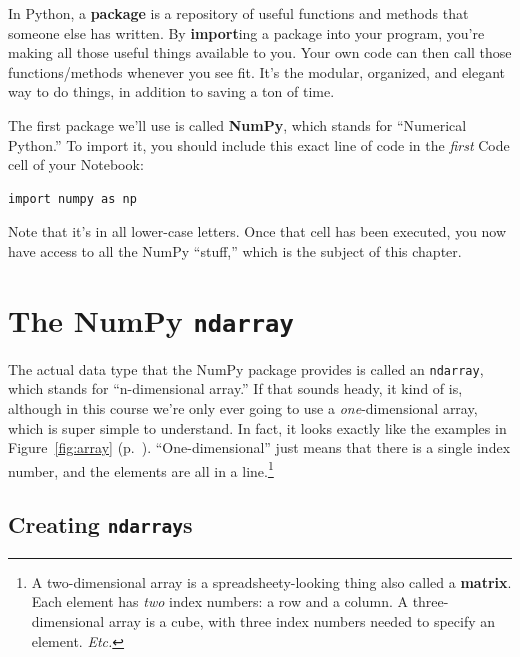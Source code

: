 In Python, a \textbf{package} is a repository of useful functions and methods
that someone else has written. By \textbf{import}ing a package into your
program, you're making all those useful things available to you. Your own code
can then call those functions/methods whenever you see fit. It's the modular,
organized, and elegant way to do things, in addition to saving a ton of time.

The first package we'll use is called \textbf{NumPy}, which stands for
``Numerical Python.'' To import it, you should include this exact line of code
in the \textit{first} Code cell of your Notebook:

\begin{Verbatim}[fontsize=\small,samepage=true,frame=single,framesep=3mm]
import numpy as np
\end{Verbatim}

Note that it's in all lower-case letters. Once that cell has been executed, you
now have access to all the NumPy ``stuff,'' which is the subject of this
chapter.

\section{The NumPy \texttt{ndarray}}
\label{sec:creatingArrays}


The actual data type that the NumPy package provides is called an
\texttt{ndarray}, which stands for ``n-dimensional array.'' If that sounds
heady, it kind of is, although in this course we're only ever going to use a
\textit{one}-dimensional array, which is super simple to understand. In fact,
it looks exactly like the examples in Figure~\ref{fig:array}
(p.~\pageref{fig:array}). ``One-dimensional'' just means that there is a single
index number, and the elements are all in a line.\footnote{A two-dimensional
array is a spreadsheety-looking thing also called a \textbf{matrix}. Each
element has \textit{two} index numbers: a row and a column. A three-dimensional
array is a cube, with three index numbers needed to specify an element.
\textit{Etc.}}

\subsection{Creating \texttt{ndarray}s}

